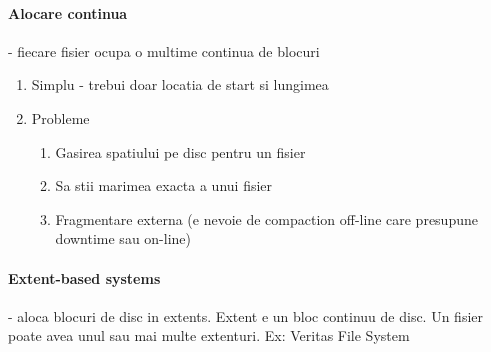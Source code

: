 \documentclass{article}
\begin{document}
\paragraph*{Alocare continua} - fiecare fisier ocupa o multime continua de blocuri
\begin{enumerate}
    \item Simplu - trebui doar locatia de start si lungimea
    \item Probleme
          \begin{enumerate}
              \item Gasirea spatiului pe disc pentru un fisier
              \item Sa stii marimea exacta a unui fisier
              \item Fragmentare externa (e nevoie de compaction off-line care presupune downtime sau on-line)
          \end{enumerate}
\end{enumerate}

\paragraph*{Extent-based systems} - aloca blocuri de disc in extents. Extent e un bloc continuu de disc. Un fisier poate avea unul sau mai multe extenturi. Ex: Veritas File System
\end{document}
